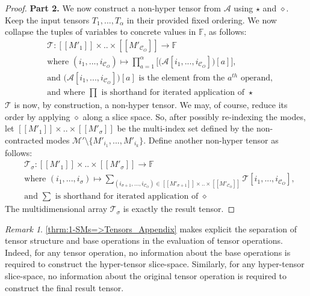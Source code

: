 \documentclass{article}
\theoremstyle{plain}
\theoremstyle{definition}
\theoremstyle{remark}
\newtheorem{remark}[theorem]{Remark}
\newcommand{\cC}{\mathcal{C}}
\newcommand{\cA}{\mathcal{A}}
\newcommand{\cM}{\mathcal{M}}
\newcommand{\cT}{\mathcal{T}}
\begin{document}
\begin{proof}
	\textbf{Part 2.}
	We now construct a non-hyper tensor from $\cA$ using $\star$ and $\diamond$. Keep the input tensors $T_1, ..., T_{\alpha}$ in their provided fixed ordering. We now collapse the tuples of variables to concrete values in $\mathbb{F}$, as follows:
	\begin{equation}
		\begin{aligned}
			&\cT: [[M'_1]]  \times .. \times [[M'_{\cC_O}]] \rightarrow \mathbb{F}\\
			&\text{where }(i_1, ..., i_{\cC_O}) \mapsto  \prod_{a=1}^{\alpha} \Bigg[ \big(\cA[i_1, ..., i_{\cC_O}] \big)[a] \Bigg],\\
			&\text{and } \big(\cA[i_1, ..., i_{\cC_O}] \big)[a] \text{ is the element from the } a^{th} \text{ operand,}\\
			&\text{and where }\prod \text{ is shorthand for iterated application of } \star
		\end{aligned}
		\label{eq:EvalOfA}
	\end{equation}
	$\cT$ is now, by construction, a non-hyper tensor. We may, of course, reduce its order by applying $\diamond$ along a slice space. So, after possibly re-indexing the modes, let $[[M'_1]]  \times .. \times [[M'_{\sigma}]]$ be the multi-index set defined by the non-contracted modes $\cM' \setminus \{M'_{i_1}, ..., M'_{i_k}\}$. Define another non-hyper tensor as follows:
	\begin{equation*}
		\begin{aligned}
			&\cT_{\sigma}: [[M'_1]]  \times .. \times [[M'_{\sigma}]] \rightarrow \mathbb{F}\\
			&\text{where }(i_1, ..., i_{\sigma}) \mapsto  \sum_{(i_{\sigma + 1},...,i_{\cC_O}) \in [[M'_{\sigma + 1}]]  \times .. \times [[M'_{\cC_O}]]} \cT[i_1, ..., i_{\cC_O}],\\
			&\text{and }\sum \text{ is shorthand for iterated application of } \diamond
		\end{aligned}
	\end{equation*}
	The multidimensional array $\cT_{\sigma}$ is exactly the result tensor.
\end{proof}
\begin{remark}
	\cref{thrm:1-SMs=>Tensors_Appendix} makes explicit the separation of tensor structure and base operations in the evaluation of tensor operations. Indeed, for any tensor operation, no information about the base operations is required to construct the hyper-tensor slice-space. Similarly, for any hyper-tensor slice-space, no information about the original tensor operation is required to construct the final result tensor.
\end{remark}
\end{document}

